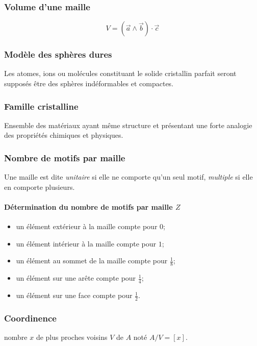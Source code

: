 \subsubsection{Volume d'une maille}
\begin{prop}
    \begin{equation}
        V = (\vec{a} \wedge \vec{b}) \cdot \vec{c}
        \label{eq:volume}
    \end{equation}
\end{prop}

\subsubsection{Modèle des sphères dures}
Les atomes, ions ou molécules constituant le solide cristallin parfait seront
supposés être des sphères indéformables et compactes.

\subsubsection{Famille cristalline}
Ensemble des matériaux ayant même structure et présentant une forte analogie des
propriétés chimiques et physiques.

\subsubsection{Nombre de motifs par maille}
Une maille est dite \emph{unitaire} si elle ne comporte qu'un seul motif,
\emph{multiple} si elle en comporte plusieurs.
\paragraph{Détermination du nombre de motifs par maille $Z$}
\begin{itemize}
    \item un élément extérieur à la maille compte pour $0$;
    \item un élément intérieur à la maille compte pour $1$;
    \item un élément au sommet de la maille compte pour $\frac{1}{8}$;
    \item un élément sur une arête compte pour $\frac{1}{4}$;
    \item un élément sur une face compte pour $\frac{1}{2}$.
\end{itemize}

\subsubsection{Coordinence}
\begin{defi}
    nombre $x$ de plus proches voisins $V$ de $A$ noté $A/V = [x]$.
\end{defi}

